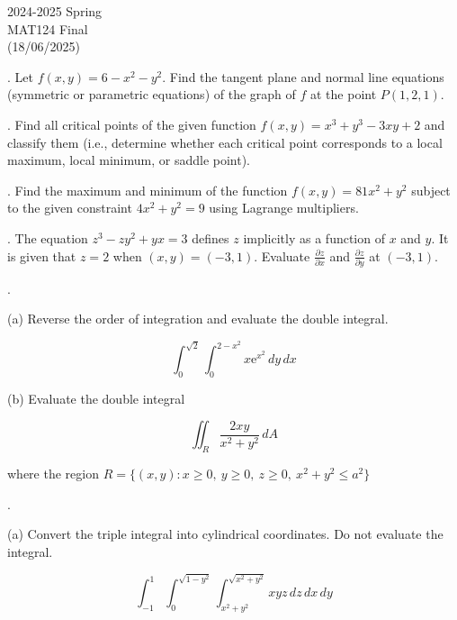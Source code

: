 \documentclass{article}
\begin{document}
\pagestyle{empty}
\large

\begin{center}
2024-2025 Spring \\MAT124 Final\\(18/06/2025)
\end{center}

. Let $f(x,y)=6-x^2-y^2$. Find the tangent plane and normal line equations (symmetric or parametric equations) of the graph of $f$ at the point $P(1,2,1)$.

\hfill

. Find all critical points of the given function $f(x,y)=x^3+y^3-3xy+2$ and classify them (i.e., determine whether each critical point corresponds to a local maximum, local minimum, or saddle point).

\hfill

. Find the maximum and minimum of the function $f(x,y)=81x^2+y^2$ subject to the given constraint $4x^2+y^2=9$ using Lagrange multipliers.

\hfill

. The equation $z^3-zy^2+yx=3$ defines $z$ implicitly as a function of $x$ and $y$. It is given that $z=2$ when $(x,y)=(-3,1)$. Evaluate $\displaystyle\frac{\partial z}{\partial x}$ and $\displaystyle\frac{\partial z}{\partial y}$ at $(-3,1)$.

\hfill

.

\hfill

\noindent (a) Reverse the order of integration and evaluate the double integral.

\[\int_0^{\sqrt2}\int_0^{2-x^2}x\mathrm{e}^{x^2}\,dy\,dx\]
 
\hfill

\noindent (b) Evaluate the double integral

\[\iint_R \frac{2xy}{x^2+y^2}\,dA\]

\hfill

\noindent where the region $R = \{(x,y): x\geq0,\:y\geq0,\:z\geq0,\:x^2+y^2\leq a^2\}$

\hfill

. 

\hfill

\noindent (a) Convert the triple integral into cylindrical coordinates. Do not evaluate the integral.

\[\int_{-1}^1\int_0^{\sqrt{1-y^2}}\int_{x^2+y^2}^{\sqrt{x^2+y^2}}xyz\,dz\,dx\,dy\]
\end{document}
